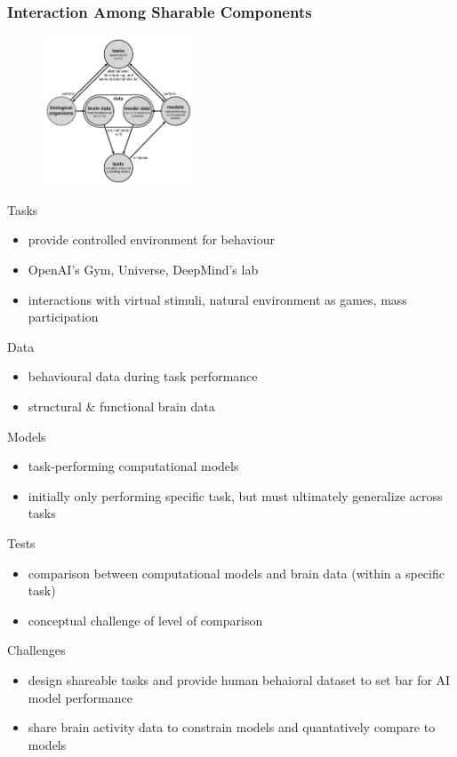 \documentclass[
t, %
10pt, %
aspectratio=1610, %
ngerman,
english,
]{beamer}
\begin{document}
\begin{frame}
    \frametitle{Interaction Among Sharable Components}
    \begin{figure}
     \includegraphics[width=0.4\textwidth]{figures/figure4}
    \end{figure}
    Tasks
    \begin{itemize}
     \item provide controlled environment for behaviour
     \item OpenAI's Gym, Universe, DeepMind's lab
     \item interactions with virtual stimuli, natural environment as games, mass participation
    \end{itemize}
    Data
    \begin{itemize}
     \item behavioural data during task performance
     \item structural \& functional brain data
    \end{itemize}
    Models
    \begin{itemize}
     \item task-performing computational models
     \item initially only performing specific task, but must ultimately generalize across tasks 
    \end{itemize}
    Tests
    \begin{itemize}
     \item comparison between computational models and brain data (within a specific task)
     \item conceptual challenge of level of comparison
    \end{itemize}
    Challenges
    \begin{itemize}
     \item design shareable tasks and provide human behaioral dataset to set bar for AI model performance
     \item share brain activity data to constrain models and quantatively compare to models
    \end{itemize}



\end{frame}
\end{document}
